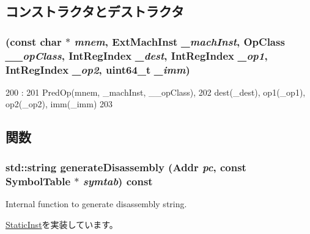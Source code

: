 \subsection{コンストラクタとデストラクタ}
\hypertarget{classRegRegRegImmOp_ae40a8ce5cca6288868919642d9e65170}{
\subsubsection[{RegRegRegImmOp}]{ (const char $\ast$ {\em mnem}, \/  {\bf ExtMachInst} {\em \_\-machInst}, \/  OpClass {\em \_\-\_\-opClass}, \/  {\bf IntRegIndex} {\em \_\-dest}, \/  {\bf IntRegIndex} {\em \_\-op1}, \/  {\bf IntRegIndex} {\em \_\-op2}, \/  uint64\_\-t {\em \_\-imm})}}
\label{classRegRegRegImmOp_ae40a8ce5cca6288868919642d9e65170}



\begin{DoxyCode}
200                                   :
201         PredOp(mnem, _machInst, __opClass),
202         dest(_dest), op1(_op1), op2(_op2), imm(_imm)
203     {}

\end{DoxyCode}


\subsection{関数}
\hypertarget{classRegRegRegImmOp_a95d323a22a5f07e14d6b4c9385a91896}{
\subsubsection[{generateDisassembly}]{\setlength{\rightskip}{0pt plus 5cm}std::string generateDisassembly ({\bf Addr} {\em pc}, \/  const SymbolTable $\ast$ {\em symtab}) const}}
\label{classRegRegRegImmOp_a95d323a22a5f07e14d6b4c9385a91896}
Internal function to generate disassembly string. 

\hyperlink{classStaticInst_ab4a569d2623620c04f8a52bbd91d63b9}{StaticInst}を実装しています。


